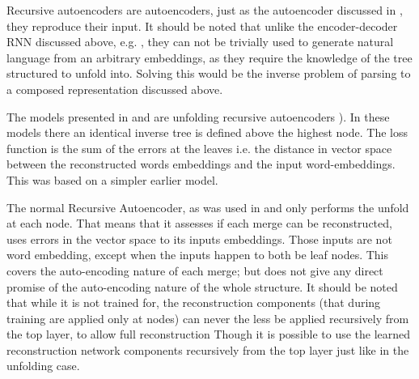 \documentclass[12pt,parskip]{komatufte}
\begin{document}
Recursive autoencoders are autoencoders, just as the autoencoder discussed in , they reproduce their input.
It should be noted that unlike the encoder-decoder RNN discussed above, e.g. ,
they can not be trivially used to generate natural language from an arbitrary embeddings, as they require the knowledge of the tree structured to unfold into.
Solving this would be the inverse problem of parsing to a composed representation discussed above.

The models presented in \textcite{SocherEtAl2011:PoolRAE} and \textcite{iyyer2014generating}
are unfolding recursive autoencoders ).
In these models there an identical inverse tree is defined above the highest node.
The loss function is the sum of the errors at the leaves i.e. the distance in vector space between the reconstructed words embeddings and the input word-embeddings.
This was based on a simpler earlier model.


The normal Recursive Autoencoder,
as was used in \textcite{SocherEtAl2011:RAE} and \textcite{zhang2014BRAE} only performs the unfold at each node.
That means that it assesses if each merge can be reconstructed, uses errors in the vector space to its inputs embeddings.
Those inputs are not word embedding, except when the inputs happen to both be leaf nodes.
This covers the auto-encoding nature of each merge;
but does not give any direct promise of the auto-encoding nature of the whole structure.
It should be noted that while it is not trained for, the reconstruction components (that during training are applied only at nodes) can never the less be applied recursively from the top layer, to allow full reconstruction
Though it is possible to use the learned reconstruction network components recursively from the top layer just like in the unfolding case.
\end{document}
